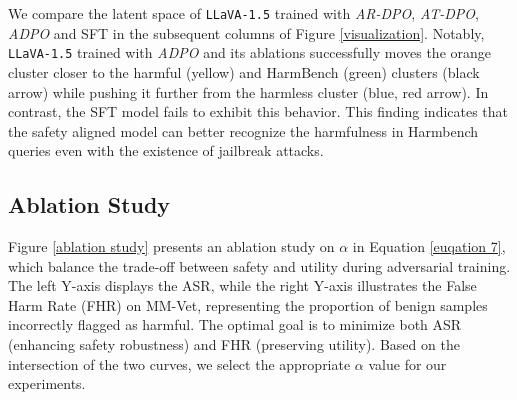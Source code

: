 We compare the latent space of \texttt{LLaVA-1.5} trained with \textit{AR-DPO}, \textit{AT-DPO}, \textit{ADPO} and SFT in the subsequent columns of Figure \ref{visualization}. Notably, \texttt{LLaVA-1.5} trained with \textit{ADPO} and its ablations successfully moves the orange cluster closer to the harmful (yellow) and HarmBench (green) clusters (black arrow) while pushing it further from the harmless cluster (blue, red arrow). In contrast, the SFT model fails to exhibit this behavior. This finding indicates that the safety aligned model can better recognize the harmfulness in  Harmbench queries even with the existence of jailbreak attacks.  








\vspace{-.5em}
\subsection{Ablation Study}
\vspace{-.5em}



Figure \ref{ablation study} presents an ablation study on $\alpha$ in Equation \ref{euqation 7}, which balance the trade-off between safety and utility during adversarial training. The left Y-axis displays the ASR, while the right Y-axis illustrates the False Harm Rate (FHR) on MM-Vet, representing the proportion of benign samples incorrectly flagged as harmful. The optimal goal is to minimize both ASR (enhancing safety robustness) and FHR (preserving utility). Based on the intersection of the two curves, we select the appropriate $\alpha$ value for our experiments.


